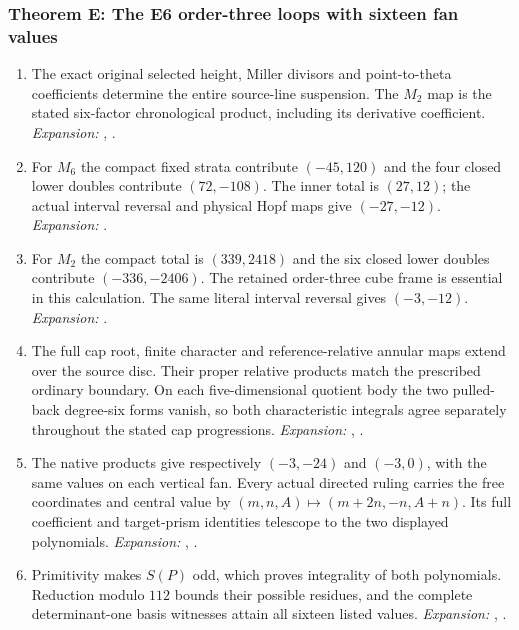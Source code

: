 \hypertarget{outline-IV-E}{}
\subsubsection*{Theorem E: The E6 order-three loops with sixteen fan values}
\begin{enumerate}[label=\arabic*.,leftmargin=*]

\item\hypertarget{step-IV-E-1}{} The exact original selected height, Miller divisors and
point-to-theta coefficients determine the entire source-line
suspension. The $M_2$ map is the stated six-factor chronological
product, including its derivative coefficient.
\textit{Expansion:} , .

\item\hypertarget{step-IV-E-2}{} For $M_6$ the compact fixed strata contribute $(-45,120)$
and the four closed lower doubles contribute $(72,-108)$.
The inner total is $(27,12)$; the actual interval reversal and
physical Hopf maps give $(-27,-12)$.
\textit{Expansion:} .

\item\hypertarget{step-IV-E-3}{} For $M_2$ the compact total is $(339,2418)$ and the six
closed lower doubles contribute $(-336,-2406)$. The retained
order-three cube frame is essential in this calculation.
The same literal interval reversal gives $(-3,-12)$.
\textit{Expansion:} .

\item\hypertarget{step-IV-E-4}{} The full cap root, finite character and reference-relative
annular maps extend over the source disc. Their proper relative
products match the prescribed ordinary boundary. On each
five-dimensional quotient body the two pulled-back degree-six
forms vanish, so both characteristic integrals agree separately
throughout the stated cap progressions.
\textit{Expansion:} , .

\item\hypertarget{step-IV-E-5}{} The native products give respectively $(-3,-24)$ and
$(-3,0)$, with the same values on each vertical fan. Every actual
directed ruling carries the free coordinates and central value by
$(m,n,A)\mapsto(m+2n,-n,A+n)$. Its full coefficient and
target-prism identities telescope to the two displayed polynomials.
\textit{Expansion:} , .

\item\hypertarget{step-IV-E-6}{} Primitivity makes $S(P)$ odd, which proves integrality of
both polynomials. Reduction modulo $112$ bounds their possible
residues, and the complete determinant-one basis witnesses attain
all sixteen listed values.
\textit{Expansion:} , .

\end{enumerate}

